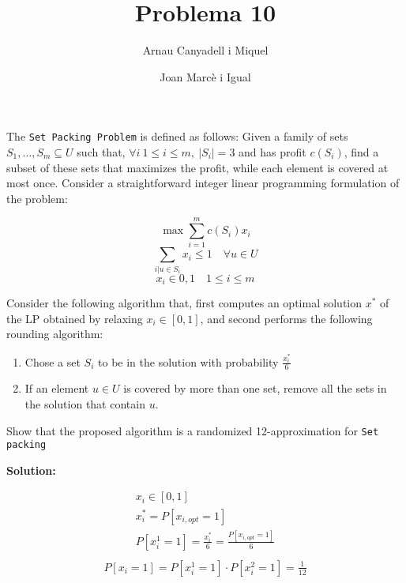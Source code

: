 \documentclass[a4paper]{article}
\title{Problema 10}
\author{Arnau Canyadell i Miquel \and Joan Marcè i Igual}
\date{}
\begin{document}
\maketitle

The \texttt{Set Packing Problem} is defined as follows: Given a family of sets $S_1,...,S_m \subseteq U$ such that, $\forall i \ 1 \le i \le m,\ |S_i|=3$ and has profit $c(S_i)$, find a subset of these sets that maximizes the profit, while each element is covered at most once. Consider a straightforward integer linear programming formulation of the problem:

$$
\max \sum_{i=1}^m c(S_i)x_i
$$
$$
\sum_{i|u\in S_i} x_i \le 1 \quad \forall u \in U
$$
$$
x_i \in {0, 1} \quad 1 \le i \le m
$$

Consider the following algorithm that, first computes an optimal solution $x^*$ of the LP obtained by relaxing $x_i \in [0, 1]$, and second performs the following rounding algorithm:
\begin{enumerate}
	\item Chose a set $S_i$ to be in the solution with probability $\frac{x_i^*}{6}$
	\item If an element $u\in U$ is covered by more than one set, remove all the sets in the solution that contain $u$.
\end{enumerate}

Show that the proposed algorithm is a randomized 12-approximation for \texttt{Set packing}

\textbf{Solution:}


\begin{gather*}
	x_i \in [0,1] \\
	x_i^* = P[x_{i,opt} = 1] \\
	P[x_i^1 = 1] = \frac{x_i^*}{6} = \frac{P[x_{i,opt} = 1]}{6} \\
\end{gather*}
\begin{gather*}
	P[x_i = 1] = P[x_i^1 = 1] \cdot P[x_i^2 = 1] = \frac{1}{12}
\end{gather*}
\end{document}
